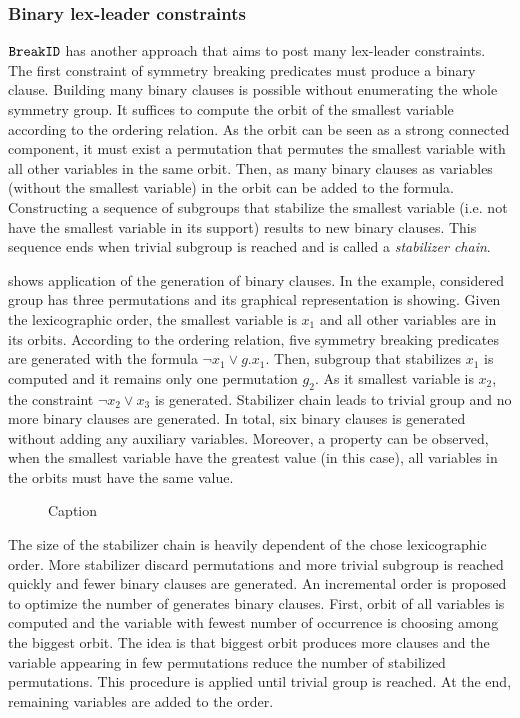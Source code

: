 \subsubsection{Binary lex-leader constraints}
$\texttt{BreakID}$ has another approach that aims to post many lex-leader constraints.
The first constraint of symmetry breaking predicates must produce a binary clause.
Building many binary clauses is possible without enumerating the whole symmetry group. 
It suffices to compute the orbit of the smallest variable according to the ordering relation. As the orbit can be seen as a strong connected component, it must exist a permutation that permutes the smallest variable with all other variables in the same orbit.
Then, as many binary clauses as variables (without the smallest variable) in the orbit can be added to the formula. Constructing a sequence of subgroups that stabilize the smallest variable (i.e. not have the smallest variable in its support) results to new binary clauses.
This sequence ends when trivial subgroup is reached and is called a  \emph{stabilizer chain}.

 shows application of the generation of binary clauses.
In the example, considered group has three permutations and its graphical representation
is showing. Given the lexicographic order, the smallest variable is $x_1$ and 
all other variables are in its orbits. According to the ordering relation, five 
symmetry breaking predicates are generated with the formula $\neg x_1 \lor g.x_1$.
Then, subgroup that stabilizes $x_1$ is computed and it remains only one permutation $g_2$.
As it smallest variable is $x_2$, the constraint $\neg x_2 \lor x_3$ is generated.
Stabilizer chain leads to trivial group and no more binary clauses are generated.
In total, six binary clauses is generated without adding any auxiliary variables.
Moreover, a property can be observed, when the smallest variable have the greatest value 
(\true in this case), all variables in the orbits must have the same value.
 \begin{figure}[!htbp]
 
 \caption{Caption}
 \label{fig:binary_sbp}
\end{figure}

The size of the stabilizer chain is heavily dependent of the chose lexicographic order.
More stabilizer discard permutations and more trivial subgroup is reached quickly and fewer 
binary clauses are generated. An incremental order is proposed to optimize the number of generates binary clauses. First, orbit of all variables is computed and the variable with fewest number of occurrence is choosing among the biggest orbit. The idea is that biggest orbit produces more
clauses and the variable appearing in few permutations reduce the number of stabilized permutations. This procedure is applied until trivial group is reached. At the end, remaining variables are added to the order.

